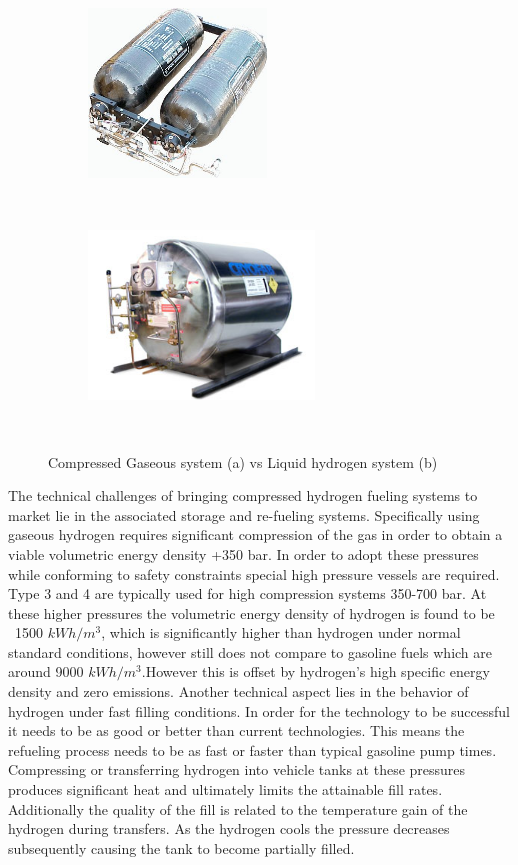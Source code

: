 \documentclass[paper=a4, fontsize=11pt, abstract=on]{scrartcl}
\numberwithin{equation}{section}		%
\numberwithin{figure}{section}			%
\numberwithin{table}{section}				%
\begin{document}
\begin{figure}[H]
        
        \begin{subfigure}[H]{0.45\textwidth}
        \centering
                \includegraphics[height = 4.5cm]{tank1}
                \caption{}				
        \end{subfigure}%
       ~~~~~
        \begin{subfigure}[h]{0.45\textwidth}
        \centering
                \includegraphics[height = 4.5cm]{cry}
                \caption{}
                
        \end{subfigure}
        ~~~~~
        \caption{Compressed Gaseous system (a) vs Liquid hydrogen system (b)}
        \label{results}
\end{figure}

The technical challenges of bringing compressed hydrogen fueling systems to market lie in the associated storage and re-fueling systems. Specifically using gaseous hydrogen requires significant compression of the gas in order to obtain a viable volumetric energy density +350 bar. In order to adopt these pressures while conforming to safety constraints special high pressure vessels are required.  Type 3 and 4 are typically used for high compression systems 350-700 bar. At these higher pressures the volumetric energy density of hydrogen is found to be ~1500 $kWh/m^3$, which is significantly higher than hydrogen under normal standard conditions, however still does not compare to gasoline fuels which are around 9000 $kWh/m^3$.However this is offset by hydrogen's high specific energy density and zero emissions. Another technical aspect lies in the behavior of hydrogen under fast filling conditions. In order for the technology to be successful it needs to be as good or better than current technologies. This means the refueling process needs to be as fast or faster than typical gasoline pump times. Compressing or transferring hydrogen into vehicle tanks at these pressures produces significant heat and ultimately limits the attainable fill rates. Additionally the quality of the fill is related to the temperature gain of the hydrogen during transfers. As the hydrogen cools the pressure decreases subsequently causing the tank to become partially filled.  
\end{document}
